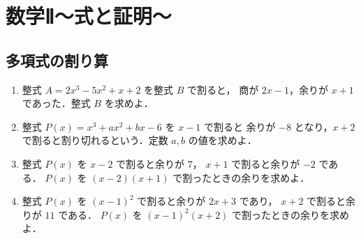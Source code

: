 \documentclass[../../../ms_q.tex]{subfiles}
\begin{document}
\setlength{\abovedisplayskip}{2mm}
\setlength{\belowdisplayskip}{1mm}

\section{数学Ⅱ～式と証明～}

\subsection{多項式の割り算}

\begin{enumerate}
    \item 整式 $A = 2x^3 - 5x^2 + x + 2$ を整式 $B$ で割ると，
        商が $2x - 1$，余りが $x + 1$ であった．整式 $B$ を求めよ．
    
    \item 整式 $P(x) = x^3 + ax^2 + bx - 6$ を $x - 1$ で割ると
        余りが $-8$ となり，$x + 2$ で割ると割り切れるという．定数 $a, b$ の値を求めよ．
    
    \item 整式 $P(x)$ を $x - 2$ で割ると余りが $7$，
        $x + 1$ で割ると余りが $-2$ である．
        $P(x)$ を $(x - 2)(x + 1)$ で割ったときの余りを求めよ．
    
    \item 整式 $P(x)$ を $(x - 1)^2$ で割ると余りが $2x + 3$ であり，
        $x + 2$ で割ると余りが $11$ である．
        $P(x)$ を $(x - 1)^2(x + 2)$ で割ったときの余りを求めよ．
\end{enumerate}
\end{document}
